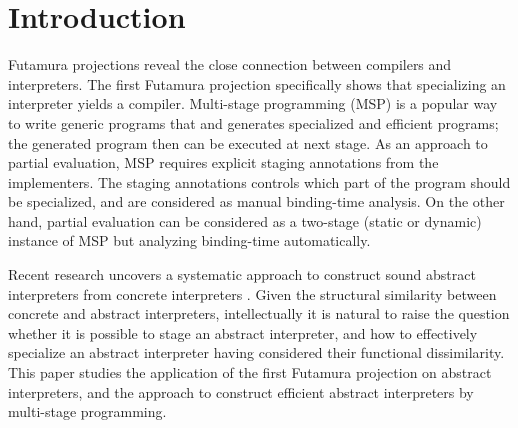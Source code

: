 \section{Introduction}


Futamura projections \cite{Futamura1999, futamura1971partial} reveal the close connection between 
compilers and interpreters. 
The first Futamura projection specifically shows that specializing an interpreter yields a compiler. 
Multi-stage programming (MSP) \cite{taha1999multi, DBLP:conf/pepm/TahaS97} is a popular way to write 
generic programs that and generates specialized and efficient programs;  
the generated program then can be executed at next stage. 
As an approach to partial evaluation, MSP requires explicit staging annotations from the implementers.
The staging annotations controls which part of the program should be specialized, and are considered 
as manual binding-time analysis. On the other hand, partial evaluation \cite{DBLP:books/daglib/0072559} 
can be considered as a two-stage (static or dynamic) instance of MSP but analyzing binding-time automatically. 

Recent research  uncovers a systematic approach to construct sound abstract interpreters 
from concrete interpreters \cite{DBLP:journals/jfp/HornM12, DBLP:conf/icfp/HornM10, DBLP:journals/pacmpl/DaraisLNH17}.
Given the structural similarity between concrete and abstract interpreters, intellectually 
it is natural to raise the question whether it is possible to stage an abstract interpreter, and how 
to effectively specialize an abstract interpreter having considered their functional dissimilarity. 
This paper studies the application of the first Futamura projection on abstract interpreters, 
and the approach to construct efficient abstract interpreters by multi-stage programming.

